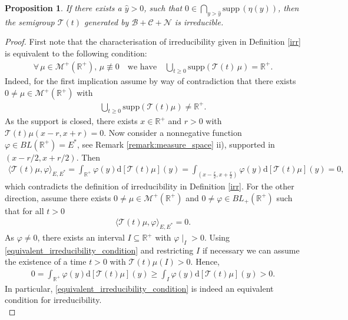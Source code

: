 \documentclass[12pt,a4paper]{amsart}
\newcommand{\ud}{\mathrm{d}}
\newtheorem{proposition}[theorem]{Proposition}
\newcommand{\R}{\mathbb{R}}
\begin{document}
\begin{proposition}\label{irreducible}
If there exists a $\hat{y}>0$, such that $0\in\displaystyle\bigcap_{y>\hat{y}}\text{supp}\,(\eta(y))$, then the semigroup $\mathcal{T}(t)$ generated by $\mathcal{B}+\mathcal{C}+\mathcal{N}$ is irreducible. 
\end{proposition}
\begin{proof}
First note that the characterisation of irreducibility given in Definition \ref{irr}  is equivalent to the following condition: 
    \begin{align}
    \label{equivalent_irreducibility_condition}
    \forall\,\mu\in \mathcal{M}^+(\R^+),\,\mu\not\equiv 0\quad \text{we have}\quad \displaystyle\bigcup_{t\ge 0} \text{supp}(\mathcal{T}(t)\,\mu)=\mathbb{R}^+.
    \end{align}
Indeed, for the first implication assume by way of contradiction that  there exists $0\neq\mu\in \mathcal{M}^+(\R^+)$ with
    \begin{align*}
        \bigcup_{t\geq 0}\text{supp}(\mathcal{T}(t)\mu)\neq \R^+.
    \end{align*}
As the support is closed, there exists $x\in \R^+$ and $r>0$ with $\mathcal{T}(t)\mu(x-r,x+r)=0$. Now consider a nonnegative function $\varphi\in BL(\R^+)=E^*$, see Remark \ref{remark:measure_space} ii), supported in $(x- r/2,x+r/2)$. Then 
    \begin{align*}
    \langle \mathcal{T}(t)\mu,\varphi\rangle_{E,E^*}=\int_{\R^+}\varphi(y)\ud[\mathcal{T}(t)\mu](y)=\int_{\left(x-\frac r 2,x+\frac r 2\right)}\varphi(y)\ud[\mathcal{T}(t)\mu](y)=0,
    \end{align*}
which contradicts the definition of irreducibility in Definition \ref{irr}. For the other direction, assume there exists $0\neq\mu\in \mathcal{M}^+(\R^+)$ and $0\neq \varphi\in BL_+(\R^+)$ such that for all $t>0$
    \begin{align*}
    \langle \mathcal{T}(t)\mu,\varphi\rangle_{E,E^*}=0.
    \end{align*}
As $\varphi\neq 0$, there exists an interval $I\subseteq \R^+$ with $\varphi\mid_I>0$. Using \eqref{equivalent_irreducibility_condition} and restricting $I$ if necessary we can assume the existence of a time $t>0$  with $\mathcal{T}(t)\mu(I)>0$. Hence,
    \begin{align*}
        0=\int_{\R^+}\varphi(y)\ud[\mathcal{T}(t)\mu](y)\geq  \int_I \varphi(y)\ud[\mathcal{T}(t)\mu](y)>0.
    \end{align*}
In particular, \eqref{equivalent_irreducibility_condition} is indeed an equivalent condition for irreducibility.\\

\end{proof}
\end{document}
